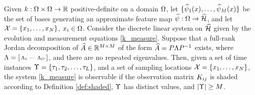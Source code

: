\begin{proposition}\label{prop:1}
Given $k:\Omega\times\Omega\to\mathbb{R}$ positive-definite on a domain $\Omega$, let $\{\widehat{\psi}_1(x), \dots, \widehat{\psi}_{M}(x)\}$ be the set of bases generating an approximate feature map $\widehat{\psi}:\Omega\to\widehat{\mathcal{H}}$, and let
$\mathcal{X} = \{x_1, \dots, x_{N}\}$, $x_i\in\Omega$. Consider the discrete linear system on $\widehat{\mathcal{H}}$ given by the evolution and measurement equations \eqref{k_measure}. Suppose that a full-rank Jordan decomposition of $\widehat{A}\in\mathbb{R}^{M\times M}$ of the form $\widehat{A} = P\Lambda P^{-1}$ exists, where $\Lambda = 
\left[\begin{smallmatrix}\Lambda_1 &\cdots & \Lambda_{O}\end{smallmatrix}\right]$,
and there are no repeated eigenvalues. Then, given a set of time instances  $\Upsilon = \{\tau_1,\tau_2,\dots,\tau_{L}\}$, and a set of sampling locations $\mathcal{X}=\{x_1, \dots, x_{N}\}$,
the system \eqref{k_measure} is observable if the observation matrix $K_{ij}$ is shaded according to Definition \ref{def:shaded},
$\Upsilon$ has distinct values, and $|\Upsilon| \geq M$.
\end{proposition}

